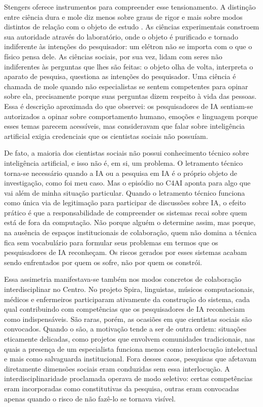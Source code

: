 Stengers oferece instrumentos para compreender esse tensionamento. A distinção entre ciência dura e mole diz menos sobre graus de rigor e mais sobre modos distintos de relação com o objeto de estudo \parencite{Stengerss2000invention}. As ciências experimentais constroem sua autoridade através do laboratório, onde o objeto é purificado e tornado indiferente às intenções do pesquisador: um elétron não se importa com o que o físico pensa dele. As ciências sociais, por sua vez, lidam com seres não indiferentes às perguntas que lhes são feitas: o objeto olha de volta, interpreta o aparato de pesquisa, questiona as intenções do pesquisador. Uma ciência é chamada de mole quando não especialistas se sentem competentes para opinar sobre ela, precisamente porque suas perguntas dizem respeito à vida das pessoas. Essa é descrição aproximada do que observei: os pesquisadores de IA sentiam-se autorizados a opinar sobre comportamento humano, emoções e linguagem porque esses temas parecem acessíveis, mas consideravam que falar sobre inteligência artificial exigia credenciais que os cientistas sociais não possuíam.

De fato, a maioria dos cientistas sociais não possui conhecimento técnico sobre inteligência artificial, e isso não é, em si, um problema. O letramento técnico torna-se necessário quando a IA ou a pesquisa em IA é o próprio objeto de investigação, como foi meu caso. Mas o episódio no C4AI aponta para algo que vai além de minha situação particular. Quando o letramento técnico funciona como única via de legitimação para participar de discussões sobre IA, o efeito prático é que a responsabilidade de compreender os sistemas recai sobre quem está de fora da computação. Não porque alguém o determine assim, mas porque, na ausência de espaços institucionais de colaboração, quem não domina a técnica fica sem vocabulário para formular seus problemas em termos que os pesquisadores de IA reconheçam. Os riscos gerados por esses sistemas acabam sendo enfrentados por quem os sofre, não por quem os constrói.

Essa assimetria manifestava-se também nos modos concretos de colaboração interdisciplinar no Centro. No projeto Spira, linguistas, músicos computacionais, médicos e enfermeiros participaram ativamente da construção do sistema, cada qual contribuindo com competências que os pesquisadores de IA reconheciam como indispensáveis. São raras, porém, as ocasiões em que cientistas sociais são convocados. Quando o são, a motivação tende a ser de outra ordem: situações eticamente delicadas, como projetos que envolvem comunidades tradicionais, nas quais a presença de um especialista funciona menos como interlocução intelectual e mais como salvaguarda institucional. Fora desses casos, pesquisas que afetavam diretamente dimensões sociais eram conduzidas sem essa interlocução. A interdisciplinaridade proclamada operava de modo seletivo: certas competências eram incorporadas como constitutivas da pesquisa, outras eram convocadas apenas quando o risco de não fazê-lo se tornava visível.

